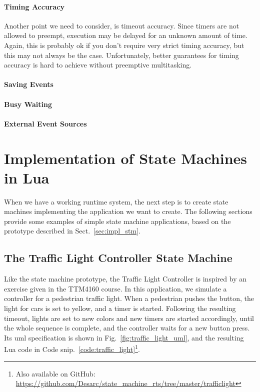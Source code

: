 \paragraph{Timing Accuracy} Another point we need to consider, is timeout accuracy. Since timers are not allowed to preempt, execution may be delayed for an unknown amount of time. Again, this is probably ok if you don't require very strict timing accuracy, but this may not always be the case. Unfortunately, better guarantees for timing accuracy is hard to achieve without preemptive multitasking.

\paragraph{Saving Events}

\paragraph{Busy Waiting}

\paragraph{External Event Sources}

\section{Implementation of State Machines in Lua}
\label{sec:impl_state_machines}
When we have a working runtime system, the next step is to create state machines implementing the application we want to create. The following sections provide some examples of simple state machine applications, based on the prototype described in Sect.~\ref{sec:impl_stm}.

\subsection{The Traffic Light Controller State Machine}
\label{sec:impl_traffic_light}
Like the state machine prototype, the Traffic Light Controller is inspired by an exercise given in the TTM4160 course. In this application, we simulate a controller for a pedestrian traffic light. When a pedestrian pushes the button, the light for cars is set to yellow, and a timer is started. Following the resulting timeout, lights are set to new colors and new timers are started accordingly, until the whole sequence is complete, and the controller waits for a new button press. Its \gls{uml} specification is shown in Fig.~\ref{fig:traffic_light_uml}, and the resulting Lua code in Code snip.~\ref{code:traffic_light}\footnote{Also available on GitHub: \url{https://github.com/Desarc/state_machine_rts/tree/master/trafficlight}}.


